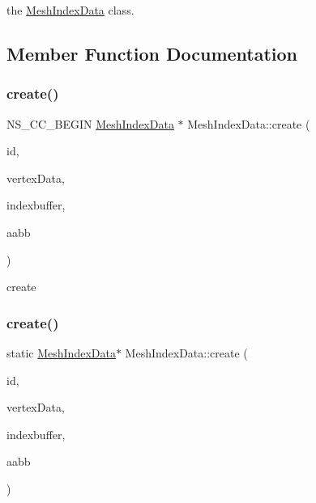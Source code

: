 the \hyperlink{classMeshIndexData}{Mesh\+Index\+Data} class. 

\subsection{Member Function Documentation}
\mbox{\label{classMeshIndexData_a33afee4a14d23cab7320289eb98eca28}} 
\subsubsection{\texorpdfstring{create()}{create()}\hspace{0.1cm}{\footnotesize\ttfamily [1/2]}}
{\footnotesize\ttfamily N\+S\+\_\+\+C\+C\+\_\+\+B\+E\+G\+IN \hyperlink{classMeshIndexData}{Mesh\+Index\+Data} $\ast$ Mesh\+Index\+Data\+::create (\begin{DoxyParamCaption}\item[{const std\+::string \&}]{id,  }\item[{\hyperlink{classMeshVertexData}{Mesh\+Vertex\+Data} $\ast$}]{vertex\+Data,  }\item[{\hyperlink{classIndexBuffer}{Index\+Buffer} $\ast$}]{indexbuffer,  }\item[{const \hyperlink{classAABB}{A\+A\+BB} \&}]{aabb }\end{DoxyParamCaption})\hspace{0.3cm}{\ttfamily [static]}}

create \mbox{\label{classMeshIndexData_a6a4dee3401b8f514b48fd98b6261830a}} 
\subsubsection{\texorpdfstring{create()}{create()}\hspace{0.1cm}{\footnotesize\ttfamily [2/2]}}
{\footnotesize\ttfamily static \hyperlink{classMeshIndexData}{Mesh\+Index\+Data}$\ast$ Mesh\+Index\+Data\+::create (\begin{DoxyParamCaption}\item[{const std\+::string \&}]{id,  }\item[{\hyperlink{classMeshVertexData}{Mesh\+Vertex\+Data} $\ast$}]{vertex\+Data,  }\item[{\hyperlink{classIndexBuffer}{Index\+Buffer} $\ast$}]{indexbuffer,  }\item[{const \hyperlink{classAABB}{A\+A\+BB} \&}]{aabb }\end{DoxyParamCaption})\hspace{0.3cm}{\ttfamily [static]}}

